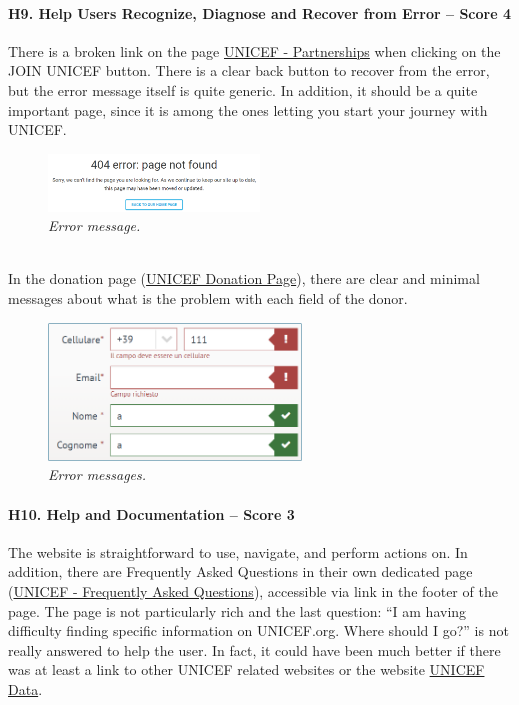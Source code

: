 \paragraph*{H9. Help Users Recognize, Diagnose and Recover from Error – Score 4}
There is a broken link on the page \href{https://www.unicef.org/partnerships}{UNICEF - Partnerships} when clicking on the JOIN UNICEF button. There is a clear back button to recover from the error, but the error message itself is quite generic. In addition, it should be a quite important page, since it is among the ones letting you start your journey with UNICEF.
\begin{figure}[h]
	\centering
	\begin{center}
		\includegraphics[width=0.5\textwidth]{Picture13.png}
	\end{center}
	\captionsetup{font=small}
	\caption{\textit{Error message.}}
	\label{fig:label13}
\end{figure}
\\
In the donation page (\href{https://donazioni.unicef.it/}{UNICEF Donation Page}), there are clear and minimal messages about what is the problem with each field of the donor.
\begin{figure}[h]
	\centering
	\begin{center}
		\includegraphics[width=0.6\textwidth]{Picture14.png}
	\end{center}
	\captionsetup{font=small}
	\caption{\textit{Error messages.}}
	\label{fig:label14}
\end{figure}

\newpage

\paragraph*{H10. Help and Documentation – Score 3}
The website is straightforward to use, navigate, and perform actions on. In addition, there are Frequently Asked Questions in their own dedicated page (\href{https://www.unicef.org/about-unicef/frequently-asked-questions}{UNICEF - Frequently Asked Questions}), accessible via link in the footer of the page. The page is not particularly rich and the last question: “I am having difficulty finding specific information on UNICEF.org. Where should I go?” is not really answered to help the user. In fact, it could have been much better if there was at least a link to other UNICEF related websites or the website \href{https://data.unicef.org/}{UNICEF Data}.

